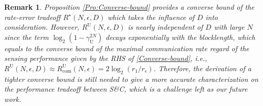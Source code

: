 \documentclass[conference,a4paper]{IEEEtran}
\newtheorem{remark}{Remark}
\begin{document}
\begin{remark}
 Proposition \ref{Pro:Converse-bound} provides a converse bound of the rate-error tradeoff $R^\star(N,\epsilon,D)$ which takes the influence of $D$ into consideration. However, $R^\mathrm{U}(N,\epsilon,D)$ is nearly independent of $D$ with large $N$ since the term $\log_2(1-\gamma_\mathrm{U}^{2N})$ decays exponentially with the blocklength, which equals to the converse bound of the maximal communication rate regard of the sensing performance given by the RHS of \eqref{Converse-bound}, i.e., $R^\mathrm{U}(N,\epsilon,D) \approx R^\mathrm{U}_\mathrm{com}(N,\epsilon) = 2\log_2(r_1/r_\epsilon)$. Therefore, the derivation of a tighter converse bound is still needed to give a more accurate characterization on the performance tradeoff between S\&C, which is a challenge left as our future work.
\end{remark}
\end{document}
